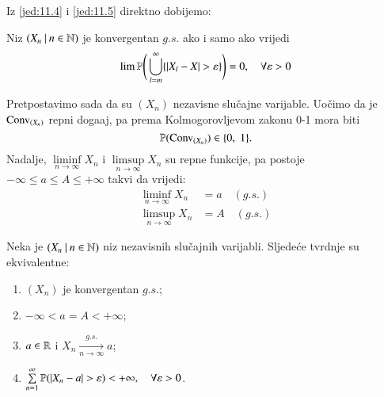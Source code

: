 Iz \eqref{jed:11.4} i \eqref{jed:11.5} direktno dobijemo:

\begin{lm}  \label{lm:11.6}
    Niz $({X_n} \: | \: {n \in \mathbb{N}})$ je konvergentan $g.s.$ ako i samo ako vrijedi
    \begin{equation*}
        \lim\limits \mathbb{P} \Bigg( \bigcup\limits_{l = m}^{\infty} \{ |X_l - X| > \varepsilon \} \Bigg) = 0, \quad \forall \varepsilon > 0
    \end{equation*}
\end{lm}

Pretpostavimo sada da su $(X_n)$ nezavisne slu\v cajne varijable.
Uo\v cimo da je $\mathrm{Conv}_{(X_n)}$ repni doga\dj aj, pa prema Kolmogorovljevom zakonu 0-1 mora biti
\begin{equation}    \label{jed:11.7}
    \mathbb{P}({\mathrm{Conv}_{(X_n)}}) \in \{ 0, \; 1 \}.
\end{equation}
Nadalje, $\liminf\limits_{n \to \infty} X_n$ i $\limsup\limits_{n \to \infty} X_n$ su repne funkcije, pa postoje $- \infty \leq a \leq A \leq +\infty$ takvi da vrijedi:
\begin{equation}    \label{jed:11.8}
    \begin{aligned}
        \liminf\limits_{n \to \infty} X_n &= a \quad (g.s.)\\
        \limsup\limits_{n \to \infty} X_n &= A \quad (g.s.)
    \end{aligned}
\end{equation}

\begin{tm}  \label{tm:11.9}
    Neka je $({X_n} \: | \: {n \in \mathbb{N}})$ niz nezavisnih slu\v cajnih varijabli.
    Sljede\' ce tvrdnje su ekvivalentne:
    \begin{enumerate}[label=(\roman*)]
        \item   \label{tm:11.9.1}
        $(X_n)$ je konvergentan $g.s.$;
        \item   \label{tm:11.9.2}
        $-\infty < a = A < +\infty$;
        \item   \label{tm:11.9.3}
        $a \in \mathbb{R}$ i $X_n \xrightarrow[n \to \infty]{g.s.} a$;
        \item   \label{tm:11.9.4}
        $\sum\limits_{n = 1}^{\infty} \mathbb{P}({|X_n - a| > \varepsilon}) < +\infty, \quad \forall \varepsilon > 0$.
    \end{enumerate}
\end{tm}

